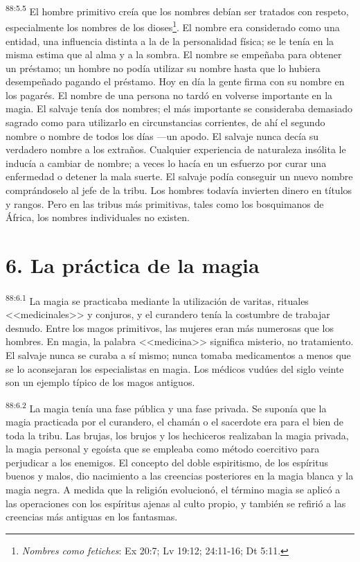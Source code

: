 \par
\textsuperscript{88:5.5} El hombre primitivo creía que los nombres debían ser tratados con respeto, especialmente los nombres de los dioses\footnote{\textit{Nombres como fetiches}: Ex 20:7; Lv 19:12; 24:11-16; Dt 5:11.}. El nombre era considerado como una entidad, una influencia distinta a la de la personalidad física; se le tenía en la misma estima que al alma y a la sombra. El nombre se empeñaba para obtener un préstamo; un hombre no podía utilizar su nombre hasta que lo hubiera desempeñado pagando el préstamo. Hoy en día la gente firma con su nombre en los pagarés. El nombre de una persona no tardó en volverse importante en la magia. El salvaje tenía dos nombres; el más importante se consideraba demasiado sagrado como para utilizarlo en circunstancias corrientes, de ahí el segundo nombre o nombre de todos los días ---un apodo. El salvaje nunca decía su verdadero nombre a los extraños. Cualquier experiencia de naturaleza insólita le inducía a cambiar de nombre; a veces lo hacía en un esfuerzo por curar una enfermedad o detener la mala suerte. El salvaje podía conseguir un nuevo nombre comprándoselo al jefe de la tribu. Los hombres todavía invierten dinero en títulos y rangos. Pero en las tribus más primitivas, tales como los bosquimanos de África, los nombres individuales no existen.

\section*{6. La práctica de la magia}
\par
\textsuperscript{88:6.1} La magia se practicaba mediante la utilización de varitas, rituales <<medicinales>> y conjuros, y el curandero tenía la costumbre de trabajar desnudo. Entre los magos primitivos, las mujeres eran más numerosas que los hombres. En magia, la palabra <<medicina>> significa misterio, no tratamiento. El salvaje nunca se curaba a sí mismo; nunca tomaba medicamentos a menos que se lo aconsejaran los especialistas en magia. Los médicos vudúes del siglo veinte son un ejemplo típico de los magos antiguos.

\par
\textsuperscript{88:6.2} La magia tenía una fase pública y una fase privada. Se suponía que la magia practicada por el curandero, el chamán o el sacerdote era para el bien de toda la tribu. Las brujas, los brujos y los hechiceros realizaban la magia privada, la magia personal y egoísta que se empleaba como método coercitivo para perjudicar a los enemigos. El concepto del doble espiritismo, de los espíritus buenos y malos, dio nacimiento a las creencias posteriores en la magia blanca y la magia negra. A medida que la religión evolucionó, el término magia se aplicó a las operaciones con los espíritus ajenas al culto propio, y también se refirió a las creencias más antiguas en los fantasmas.

